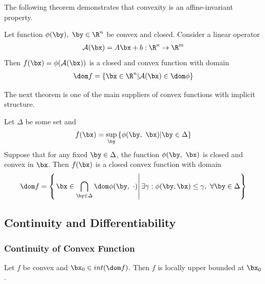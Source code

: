 The following theorem demonstrates that convexity is an affine-invariant property. 
\begin{theorem}
    Let function $\phi(\by),\ \by\in\R^n$ be convex and closed. Consider a linear operator
    \begin{align*}
        \mathcal{A}(\bx)=A\bx+b: \R^n\to \R^m
    \end{align*}
    Then $f(\bx)=\phi(\mathcal{A}(\bx))$ is a closed and convex function with domain
    \begin{align*}
        \dom f=\{ \bx\in\R^n | \mathcal{A}(\bx)\in \dom \phi \}
    \end{align*}
\end{theorem}

The next theorem is one of the main suppliers of convex functions with implicit structure. 
\begin{theorem}
    Let $\Delta$ be some set and 
    \begin{align*}
        f(\bx)=\sup_{\by}\left\{ \phi(\by,\ \bx)|\by\in\Delta \right\}
    \end{align*}
    Suppose that for any fixed $\by \in \Delta$, the function $\phi(\by,\ \bx)$ is closed and convex in $\bx$. Then $f(\bx)$ is a closed convex function with domain
    \begin{align*}
        \dom f=\left\{\left. \bx\in\bigcap_{\by\in\Delta}\dom \phi(\by,\ \cdot) \right| \exists \gamma : \phi(\by, \bx)\le \gamma,\ \forall \by \in \Delta \right\}
    \end{align*}
\end{theorem}


\subsection{Continuity and Differentiability}

\subsubsection{Continuity of Convex Function}
\begin{lemma}
    Let $f$ be convex and $\bx_0\in int(\dom f)$. Then $f$ is locally upper bounded at $\bx_0$. 
\end{lemma}


